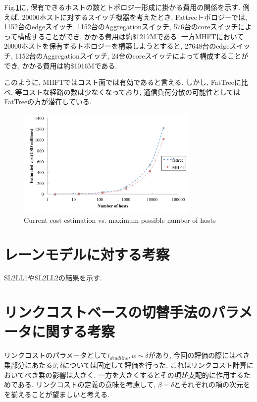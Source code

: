 Fig.\ref{fig:MHFT_cost}に, 保有できるホストの数とトポロジー形成に掛かる費用の関係を示す. 
例えば, 20000ホストに対するスイッチ機器を考えたとき, Fattreeトポロジーでは, 1152台のedgeスイッチ,
1152台のAggregationスイッチ, 576台のcoreスイッチによって構成することができ, かかる費用は約\$1217Mである. 
一方MHFTにおいて20000ホストを保有するトポロジーを構築しようとすると,  27648台のedgeスイッチ,
1152台のAggregationスイッチ, 24台のcoreスイッチによって構成することができ, かかる費用は約\$1016Mである. 

このように, MHFTではコスト面では有効であると言える.
しかし, FatTreeに比べ, 等コストな経路の数は少なくなっており, 通信負荷分散の可能性としてはFatTreeの方が潜在している. 


\begin{figure}[t]
    \begin{center}
    \includegraphics[autoebb, width=250pt]{./img/mhft_cost.pdf}
    \caption{Current cost estimation vs. maximum possible number of hosts}
    \label{fig:MHFT_cost}
    \end{center}
\end{figure}


\section{レーンモデルに対する考察}
SL2LL1やSL2LL2の結果を示す. 

\section{リンクコストベースの切替手法のパラメータに関する考察}
リンクコストのパラメータとして$t_{deadline}, \alpha \sim \delta$があり, 今回の評価の際にはべき乗部分にあたる$\beta,
\delta$については固定して評価を行った. 
これはリンクコスト計算においてべき乗の影響は大きく, 一方を大きくするとその項が支配的に作用するためである. 
リンクコストの定義の意味を考慮して, $\beta=\delta$とそれぞれの項の次元をを揃えることが望ましいと考える. 

